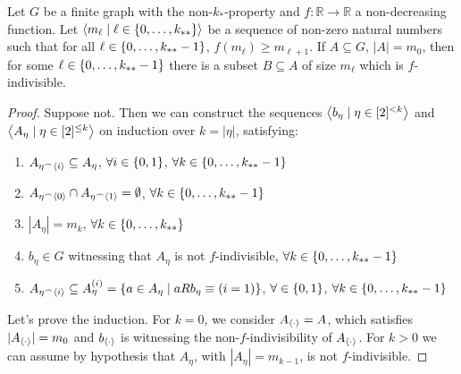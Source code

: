     \begin{lemma}[Claim 4.3] \label{existance_of_indivisible_sets}
        Let $G$ be a finite graph with the non-$k_*$-property and $f: \mathbb{R} \longrightarrow \mathbb{R}$ a non-decreasing function.
        Let $\left< m_\ell \mid \ell \in \left\{ 0, \dots, k_{**} \right\} \right>$ be a sequence of non-zero natural numbers such that
        for all $\ell \in \left\{ 0, \dots, k_{**}-1 \right\}$, $f(m_{\ell}) \geq m_{\ell+1}$.
        If $A \subseteq G$, $|A| = m_0$, then for some $\ell \in \left\{ 0, \dots, k_{**}-1 \right\}$ there is a subset $B \subseteq A$
        of size $m_\ell$ which is $f$-indivisible.
        \begin{proof}
            Suppose not.
            Then we can construct the sequences $\left< b_\eta \mid \eta \in [2]^{<k} \right>$ and $\left< A_\eta \mid \eta \in [2]^{\leq k} \right>$
            on induction over $k = |\eta|$, satisfying:
            \begin{enumerate}
                \item\label{itm:4.3.1} $A_{\eta^\frown \left< i \right>} \subseteq A_{\eta}$, $\forall i \in \left\{ 0,1 \right\}$, $\forall k \in \left\{ 0, \dots, k_{**}-1 \right\}$
                \item\label{itm:4.3.2} $A_{\eta^\frown \left< 0 \right>} \cap A_{\eta^\frown \left< 1 \right>} = \emptyset$, $\forall k \in \left\{ 0, \dots, k_{**}-1 \right\}$
                \item\label{itm:4.3.3} $|A_\eta| = m_k$, $\forall k \in \left\{ 0, \dots, k_{**} \right\}$
                \item\label{itm:4.3.4} $b_\eta \in G$ witnessing that $A_\eta$ is not $f$-indivisible, $\forall k \in \left\{ 0, \dots, k_{**}-1 \right\}$
                \item\label{itm:4.3.5} $A_{\eta^\frown \left< i \right>} \subseteq A_\eta^{(i)} = \left\{ a \in A_\eta \mid a R b_\eta \equiv (i=1) \right\}$,
                    $\forall \in \left\{ 0,1 \right\}$, $\forall k \in \left\{ 0, \dots, k_{**}-1 \right\}$
            \end{enumerate}
            Let's prove the induction.
            For $k=0$, we consider $A_{\left< \cdot \right>} = A$, which satisfies $|A_{\left< \cdot \right>}| = m_0$ and
            $b_{\left< \cdot \right>}$ is witnessing the non-$f$-indivisibility of $A_{\left< \cdot \right>}$.
            For $k > 0$ we can assume by hypothesis that $A_\eta$, with $|A_\eta| = m_{k-1}$, is not $f$-indivisible.

\end{proof}
\end{lemma}
